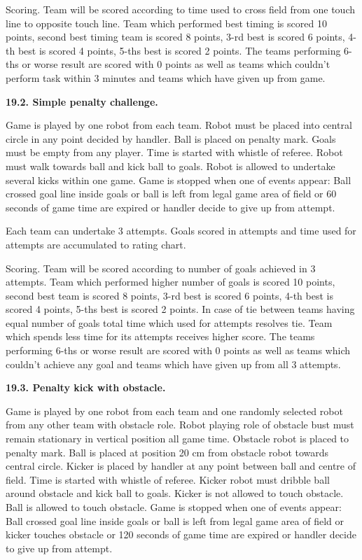 \documentclass[a4paper]{article}
\begin{document}
Scoring. Team will be scored according to time used to cross field from one touch line to opposite touch line. Team
which performed best timing is scored 10 points, second best timing team is scored 8 points, 3-rd best is scored 6
points, 4-th best is scored 4 points, 5-ths best is scored 2 points. The teams performing 6-ths or worse result are
scored with 0 points as well as teams which couldn\textgreek{’}t perform task within 3 minutes and teams which have
given up from game. \ 

\textbf{19.2. Simple penalty challenge.}

Game is played by one robot from each team. Robot must be placed into central circle in any point decided by handler.
Ball is placed on penalty mark. Goals must be empty from any player. Time is started with whistle of referee. Robot
must walk towards ball and kick ball to goals. Robot is allowed to undertake several kicks within one game. Game is
stopped when one of events appear: Ball crossed goal line inside goals or ball is left from legal game area of field or
60 seconds of game time are expired or handler decide to give up from attempt.

Each team can undertake 3 attempts. Goals scored in attempts and time used for attempts are accumulated to rating chart.


Scoring. Team will be scored according to number of goals achieved in 3 attempts. Team which performed higher number of
goals is scored 10 points, second best team is scored 8 points, 3-rd best is scored 6 points, 4-th best is scored 4
points, 5-ths best is scored 2 points. In case of tie between teams having equal number of goals total time which used
for attempts resolves tie. Team which spends less time for its attempts receives higher score. The teams performing
6-ths or worse result are scored with 0 points as well as teams which couldn\textgreek{’}t achieve any goal and teams
which have given up from all 3 attempts.

\textbf{19.3. Penalty kick with obstacle. }

Game is played by one robot from each team and one randomly selected robot from any other team with obstacle role. Robot
playing role of obstacle bust must remain stationary in vertical position all game time. Obstacle robot is placed to
penalty mark. Ball is placed at position 20 cm from obstacle robot towards central circle. Kicker is placed by handler
at any point between ball and centre of field. Time is started with whistle of referee. Kicker robot must dribble ball
around obstacle and kick ball to goals. Kicker is not allowed to touch obstacle. Ball is allowed to touch obstacle.
Game is stopped when one of events appear: Ball crossed goal line inside goals or ball is left from legal game area of
field or kicker touches obstacle or 120 seconds of game time are expired or handler decide to give up from attempt.
\end{document}
